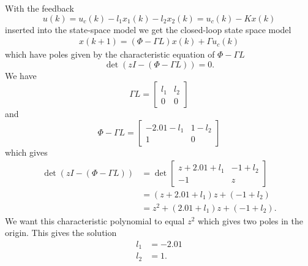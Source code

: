 \documentclass[letterpaper,12pt]{article}
\newcommand{\bbm}{\begin{bmatrix}}
\newcommand{\ebm}{\end{bmatrix}}
\begin{document}
With the feedback \[u(k) = u_c(k) - l_1 x_1(k) - l_2 x_2(k) = u_c(k) - Kx(k) \]
inserted into the state-space model we get the closed-loop state space model
\begin{equation*}
\begin{split}
x(k+1) = \left(\Phi - \Gamma L\right)x(k) + \Gamma u_c(k)
\end{split}
\end{equation*}
which have poles given by the characteristic equation of $\Phi - \Gamma L$
\[ \det \left(zI - (\Phi - \Gamma L)\right) = 0. \] We have
\[ \Gamma L = \bbm l_1 & l_2\\ 0 & 0 \ebm \] and
\[ \Phi - \Gamma L = \bbm -2.01 -l_1 & 1-l_2\\1 & 0 \ebm \] which gives
\begin{equation*}
\begin{split}
\det \left(zI - (\Phi - \Gamma L)\right)  &= \det \bbm z +2.01 + l_1 & -1 + l_2\\-1 & z \ebm\\
  &= (z +2.01 + l_1)z + (-1+l_2)\\
&= z^2 + (2.01+l_1)z + (-1+l_2).
\end{split}
\end{equation*}
We want this characteristic polynomial to equal \(z^2\) which gives two poles in the origin. This gives the solution
\begin{align*}
l_1 &= -2.01\\
l_2 &= 1.\\
\end{align*}
\end{document}
